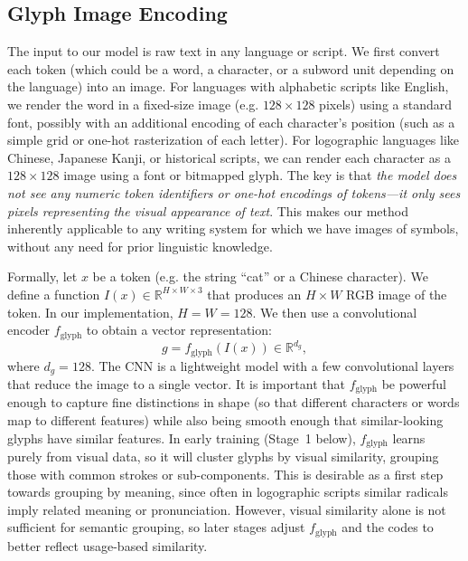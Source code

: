 \documentclass[10pt,twocolumn]{article}
\begin{document}
\subsection{Glyph Image Encoding}\label{sec:glyph}
The input to our model is raw text in any language or script. We first convert each token (which could be a word, a character, or a subword unit depending on the language) into an image. For languages with alphabetic scripts like English, we render the word in a fixed-size image (e.g. $128\times128$ pixels) using a standard font, possibly with an additional encoding of each character's position (such as a simple grid or one-hot rasterization of each letter). For logographic languages like Chinese, Japanese Kanji, or historical scripts, we can render each character as a $128\times128$ image using a font or bitmapped glyph. The key is that \emph{the model does not see any numeric token identifiers or one-hot encodings of tokens---it only sees pixels representing the visual appearance of text}. This makes our method inherently applicable to any writing system for which we have images of symbols, without any need for prior linguistic knowledge.

Formally, let $x$ be a token (e.g. the string ``cat'' or a Chinese character). We define a function $I(x) \in \mathbb{R}^{H\times W \times 3}$ that produces an $H\times W$ RGB image of the token. In our implementation, $H=W=128$. We then use a convolutional encoder $f_{\text{glyph}}$ to obtain a vector representation:
\[
    g = f_{\text{glyph}}(I(x)) \in \mathbb{R}^{d_g},
\]
where $d_g=128$. The CNN is a lightweight model with a few convolutional layers that reduce the image to a single vector. It is important that $f_{\text{glyph}}$ be powerful enough to capture fine distinctions in shape (so that different characters or words map to different features) while also being smooth enough that similar-looking glyphs have similar features. In early training (Stage~1 below), $f_{\text{glyph}}$ learns purely from visual data, so it will cluster glyphs by visual similarity, grouping those with common strokes or sub-components. This is desirable as a first step towards grouping by meaning, since often in logographic scripts similar radicals imply related meaning or pronunciation. However, visual similarity alone is not sufficient for semantic grouping, so later stages adjust $f_{\text{glyph}}$ and the codes to better reflect usage-based similarity.
\end{document}
